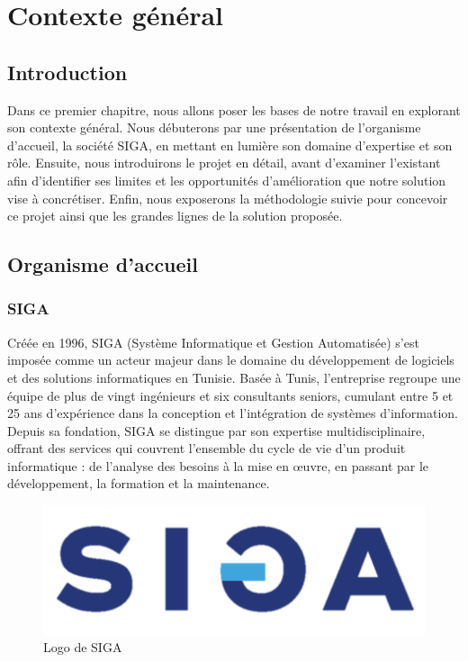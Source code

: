 \chapter{Contexte général}
\section*{Introduction}



Dans ce premier chapitre, nous allons poser les bases de notre travail en explorant son contexte général. Nous débuterons par une présentation de l’organisme d’accueil, la société SIGA, en mettant en lumière son domaine d’expertise et son rôle. Ensuite, nous introduirons le projet en détail, avant d’examiner l’existant afin d’identifier ses limites et les opportunités d’amélioration que notre solution vise à concrétiser. Enfin, nous exposerons la méthodologie suivie pour concevoir ce projet ainsi que les grandes lignes de la solution proposée.



  

\section[Organisme d'accueil]{Organisme d'accueil}

\subsection{SIGA}

Créée en 1996, SIGA (Système Informatique et Gestion Automatisée) s’est imposée comme un acteur majeur dans le domaine du développement de logiciels et des solutions informatiques en Tunisie. Basée à Tunis, l’entreprise regroupe une équipe de plus de vingt ingénieurs et six consultants seniors, cumulant entre 5 et 25 ans d’expérience dans la conception et l’intégration de systèmes d’information. Depuis sa fondation, SIGA se distingue par son expertise multidisciplinaire, offrant des services qui couvrent l’ensemble du cycle de vie d’un produit informatique : de l’analyse des besoins à la mise en œuvre, en passant par le développement, la formation et la maintenance.
\begin{figure}[H]
\centering\includegraphics[scale=0.5]{images/siga.png}
\caption{Logo de SIGA}
\label{fig:Siga_logo}
\end{figure}
    \newpage
